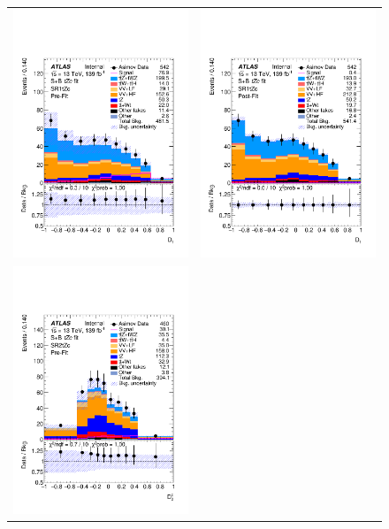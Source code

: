 \clearpage
\begin{figure}[htbp]
	\centering
	\begin{tabular}{cc}
		\includegraphics[width=.45\textwidth]{Appendices/AP8/figures/SPLUSB_CRSR_UsingSMTFullSys/Plots/SR1} &
		\includegraphics[width=.45\textwidth]{Appendices/AP8/figures/SPLUSB_CRSR_UsingSMTFullSys/Plots/SR1_postFit} \\
		\includegraphics[width=.45\textwidth]{Appendices/AP8/figures/SPLUSB_CRSR_UsingSMTFullSys/Plots/SR2} &

\end{tabular}
\end{figure}
